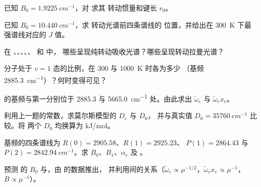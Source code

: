 \begin{exercise}[$\star$]\label{exo:b3:rovibrational-spectroscopy:1}
已知 $B_0 = \qty{1.9225}{cm^{-1}}$，对  求其
转动惯量和键长 $r_0$。
\end{exercise}

\begin{exercise}[$\star$]\label{exo:b3:rovibrational-spectroscopy:2}
已知 $B_0 = \qty{10.440}{cm^{-1}}$，求  转动光谱前四条谱线的
位置，并给出在
\qty{300}{K} 下最强谱线对应的 $J$ 值。
\end{exercise}

\begin{exercise}[$\star$]\label{exo:b3:rovibrational-spectroscopy:3}
在 、、、、、 和  中，
哪些呈现纯转动吸收光谱？哪些呈现转动拉曼光谱？
\end{exercise}

\begin{exercise}[$\star$]\label{exo:b3:rovibrational-spectroscopy:4}
 分子处于 $v = 1$ 态的比例，在 300 与 \qty{1000}{K} 时各为多少
（基频 \qty{2885.3}{cm^{-1}}）？何时变得可见？
\end{exercise}

\begin{exercise}[$\star\star$]\label{exo:b3:rovibrational-spectroscopy:5}
 的基频与第一分别位于 2885.3 与
\qty{5665.0}{cm^{-1}} 处。由此求出 $\tilde\omega_e$ 与 $\tilde\omega_ex_e$。
\end{exercise}

\begin{exercise}[$\star\star$]\label{exo:b3:rovibrational-spectroscopy:6}
利用上一题的常数，求莫尔斯模型的 $D_e$ 与 $D_0$，
并与真实值 $D_0 = \qty{35760}{cm^{-1}}$ 比较。将
两个 $D_0$ 均换算为 \unit{kJ/mol}。
\end{exercise}

\begin{exercise}[$\star\star$]\label{exo:b3:rovibrational-spectroscopy:7}
 基频的四条谱线为 $R(0) = 2905.58$、$R(1) = 2925.23$、
$P(1) = 2864.43$ 与 $P(2) = \qty{2842.94}{cm^{-1}}$。求 $B_0$、$B_1$、$\alpha_e$ 及
。
\end{exercise}

\begin{exercise}[$\star\star$]\label{exo:b3:rovibrational-spectroscopy:8}
预测  的 $B_0$ 与，由  的数据推出，
并利用间的关系（$\tilde\omega_e \propto \mu^{-1/2}$，$\tilde\omega_ex_e \propto
\mu^{-1}$，$B \propto \mu^{-1}$）。
\end{exercise}

